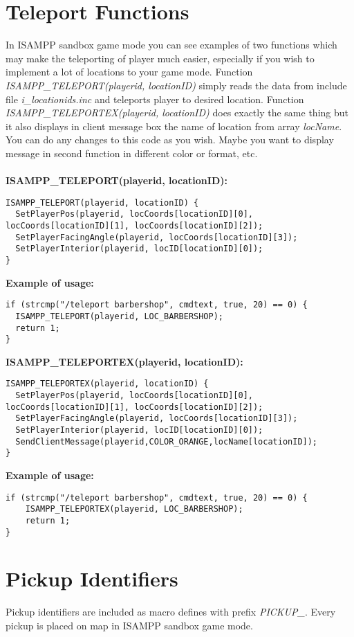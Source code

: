 \documentclass{article}
\begin{document}
\section{Teleport Functions}
In ISAMPP sandbox game mode you can see examples of two functions which may make the teleporting of player much easier, especially if you wish to implement a lot of locations to your game mode. Function \textit{ISAMPP\_TELEPORT(playerid, locationID)} simply reads the data from include file \textit{i\_locationids.inc} and teleports player to desired location. Function \textit{ISAMPP\_TELEPORTEX(playerid, locationID)} does exactly the same thing but it also displays in client message box the name of location from array \textit{locName}. You can do any changes to this code as you wish. Maybe you want to display message in second function in different color or format, etc.\\
\\
\textbf{ISAMPP\_TELEPORT(playerid, locationID):}
\begin{verbatim}
ISAMPP_TELEPORT(playerid, locationID) {
  SetPlayerPos(playerid, locCoords[locationID][0], locCoords[locationID][1], locCoords[locationID][2]);
  SetPlayerFacingAngle(playerid, locCoords[locationID][3]);
  SetPlayerInterior(playerid, locID[locationID][0]);
}
\end{verbatim}
\textbf{Example of usage:}
\begin{verbatim}
if (strcmp("/teleport barbershop", cmdtext, true, 20) == 0) {
  ISAMPP_TELEPORT(playerid, LOC_BARBERSHOP);
  return 1;
}
\end{verbatim}
\textbf{ISAMPP\_TELEPORTEX(playerid, locationID):}
\begin{verbatim}
ISAMPP_TELEPORTEX(playerid, locationID) {
  SetPlayerPos(playerid, locCoords[locationID][0], locCoords[locationID][1], locCoords[locationID][2]);
  SetPlayerFacingAngle(playerid, locCoords[locationID][3]);
  SetPlayerInterior(playerid, locID[locationID][0]);
  SendClientMessage(playerid,COLOR_ORANGE,locName[locationID]);
}
\end{verbatim}
\textbf{Example of usage:}
\begin{verbatim}
if (strcmp("/teleport barbershop", cmdtext, true, 20) == 0) {
    ISAMPP_TELEPORTEX(playerid, LOC_BARBERSHOP);
    return 1;
}
\end{verbatim}


\section{Pickup Identifiers}
Pickup identifiers are included as macro defines with prefix \textit{PICKUP\_}. Every pickup is placed on map in ISAMPP sandbox game mode.
\end{document}
